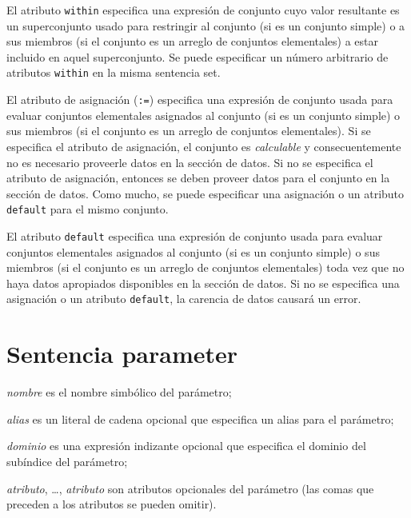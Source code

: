 \documentclass[11pt,spanish]{report}
\begin{document}
El atributo {\tt within} especifica una expresión de conjunto cuyo valor resultante es un superconjunto usado para restringir al conjunto (si es un conjunto simple) o a sus miembros (si el conjunto es un arreglo de conjuntos elementales) a estar incluido en aquel superconjunto. Se puede especificar un número arbitrario de atributos {\tt within} en la misma sentencia set.

El atributo de asignación ({\tt :=}) especifica una expresión de conjunto usada para evaluar conjuntos elementales asignados al conjunto (si es un conjunto simple) o sus miembros (si el conjunto es un arreglo de conjuntos elementales). Si se especifica el atributo de asignación, el conjunto es {\it calculable} y consecuentemente no es necesario proveerle datos en la sección de datos. Si no se especifica el atributo de asignación, entonces se deben proveer datos para el conjunto en la sección de datos. Como mucho, se puede especificar una asignación o un atributo {\tt default} para el mismo conjunto.

El atributo {\tt default} especifica una expresión de conjunto usada para evaluar conjuntos elementales asignados al conjunto (si es un conjunto simple) o sus miembros (si el conjunto es un arreglo de conjuntos elementales) toda vez que no haya datos apropiados disponibles en la sección de datos. Si no se especifica una asignación o un atributo {\tt default}, la carencia de datos causará un error.

\newpage

\section{Sentencia parameter}

\noindent
{}

\medskip

\noindent
{\it nombre} es el nombre simbólico del parámetro;

\noindent
{\it alias} es un literal de cadena opcional que especifica un alias para el parámetro;

\noindent
{\it dominio} es una expresión indizante opcional que especifica el dominio del subíndice del parámetro;

\noindent
{\it atributo}, \dots, {\it atributo} son atributos opcionales del parámetro (las comas que preceden a los atributos se pueden omitir).
\end{document}
